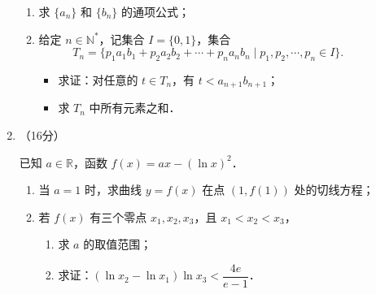 \begin{description}
\begin{enumerate}[leftmargin=5pt]
\begin{enumerate}[label=(\arabic*)]
    \item 求 $\{a_n\}$ 和 $\{b_n\}$ 的通项公式；
    \item 给定 $n\in\mathbb{N}^*$，记集合 $I=\{0,1\}$，集合
    \[
    T_n=\{p_1a_1b_1+p_2a_2b_2+\cdots+p_na_nb_n\mid p_1,p_2,\cdots,p_n\in I\}.
    \]
    \begin{itemize}
        \item[\ding{172}] 求证：对任意的 $t\in T_n$，有 $t<a_{n+1}b_{n+1}$；
        \item[\ding{173}] 求 $T_n$ 中所有元素之和．
    \end{itemize}
\end{enumerate}

        \item （16分）

        已知 $a\in\mathbb{R}$，函数 $f(x)=ax-(\ln x)^2$．

        \begin{enumerate}[label=(\arabic*)]
            \item 当 $a=1$ 时，求曲线 $y=f(x)$ 在点 $(1,f(1))$ 处的切线方程；
            \item 若 $f(x)$ 有三个零点 $x_1,x_2,x_3$，且 $x_1<x_2<x_3$，
            \begin{enumerate}[label=\textcircled{\arabic*}]
                \item 求 $a$ 的取值范围；
                \item 求证：$(\ln x_2-\ln x_1)\ln x_3<\dfrac{4e}{e-1}$．
            \end{enumerate}
        \end{enumerate}
    \end{enumerate}
\end{description}

